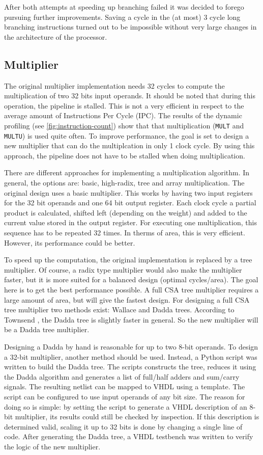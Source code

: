 \documentclass[final]{article}
\begin{document}
After both attempts at speeding up branching failed it was decided to forego pursuing further improvements. Saving a cycle in the (at most) 3 cycle long branching instructions turned out to be impossible without very large changes in the architecture of the processor.

\subsection{Multiplier}
The original multiplier implementation needs 32 cycles to compute the multiplication of two 32 bits input operands. It should be noted that during this operation, the pipeline is stalled. This is not a very efficient in respect to the average amount of Instructions Per Cycle (IPC). The results of the dynamic profiling (see \cref{fig:instruction-count}) show that that multiplication (\texttt{MULT} and \texttt{MULTU}) is used quite often. To improve performance, the goal is set to design a new multiplier that can do the multiplcation in only 1 clock cycle. By using this approach, the pipeline does not have to be stalled when doing multiplication.

There are different approaches for implementing a multiplication algorithm. In general, the options are: basic, high-radix, tree and array multiplication. The original design uses a basic multiplier. This works by having two input registers for the 32 bit operands and one 64 bit output register. Each clock cycle a partial product is calculated, shifted left (depending on the weight) and added to the current value stored in the output register. For executing one multiplication, this sequence has to be repeated 32 times. In therms of area, this is very efficient. However, its performance could be better.

To speed up the computation, the original implementation is replaced by a tree multiplier. Of course, a radix type multiplier would also make the multiplier faster, but it is more suited for a balanced design (optimal cycles/area). The goal here is to get the best performance possible. A full CSA tree multiplier requires a large amount of area, but will give the fastest design. For designing a full CSA tree multiplier two methods exist: Wallace and Dadda trees. According to Townsend \cite{townsend}, the Dadda tree is slightly faster in general. So the new multiplier will be a Dadda tree multiplier.

Designing a Dadda by hand is reasonable for up to two 8-bit operands. To design a 32-bit multiplier, another method should be used. Instead, a Python script was written to build the Dadda tree. The scripts constructs the tree, reduces it using the Dadda algorithm and generates a list of full/half adders and sum/carry signals. The resulting netlist can be mapped to VHDL using a template. The script can be configured to use input operands of any bit size. The reason for doing so is simple: by setting the script to generate a VHDL description of an 8-bit multiplier, its results could still be checked by inspection. If this description is determined valid, scaling it up to 32 bits is done by changing a single line of code. After generating the Dadda tree, a VHDL testbench was written to verify the logic of the new multiplier.
\end{document}
